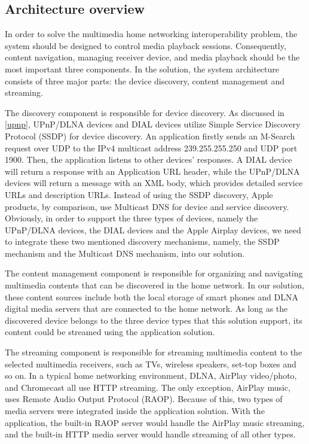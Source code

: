 \subsection{Architecture overview\label{3_1}}
In order to solve the multimedia home networking interoperability problem, the system should be designed to control media playback sessions. Consequently, content navigation, managing receiver device, and media playback should be the most important three components. In the solution, the system architecture consists of three major parts: the device discovery, content management and streaming.

The discovery component is responsible for device discovery. As discussed
in \ref{upnp}, UPnP/DLNA devices and DIAL devices utilize Simple Service Discovery
Protocol (SSDP) for device discovery. An application firstly sends an M-Search
request over UDP to the IPv4 multicast address 239.255.255.250 and UDP port 1900. Then, the application listens to other devices' responses. A DIAL device will return a response with an Application URL header, while the UPnP/DLNA devices will return a message with an XML body, which provides detailed service URLs and description URLs. Instead of using the SSDP discovery, Apple products, by comparison, use Multicast DNS for device and service discovery. Obviously, in order to support the three types of devices, namely the UPnP/DLNA devices, the DIAL devices and the Apple Airplay devices, we need to integrate these two mentioned discovery mechanisms, namely, the SSDP mechanism and the Multicast DNS mechanism, into our solution.

The content management component is responsible for organizing and
 navigating multimedia contents that can be discovered in the home network. In our solution, these content sources include both the local storage of smart phones and DLNA digital media servers that are connected to the home network. As long as the discovered device belongs to the three device types that this solution support, its content could be streamed using the application solution.

The streaming component is responsible for streaming multimedia content to the
selected multimedia receivers, such as TVs, wireless speakers, set-top boxes and so on. In a typical home networking environment, DLNA, AirPlay video/photo, and Chromecast all use HTTP streaming. The only exception, AirPlay music, uses Remote Audio Output Protocol (RAOP). Because of this, two types of media servers were integrated inside the application solution. With the application, the built-in RAOP server would handle the AirPlay music streaming, and the built-in HTTP media server would handle streaming of all other types.


